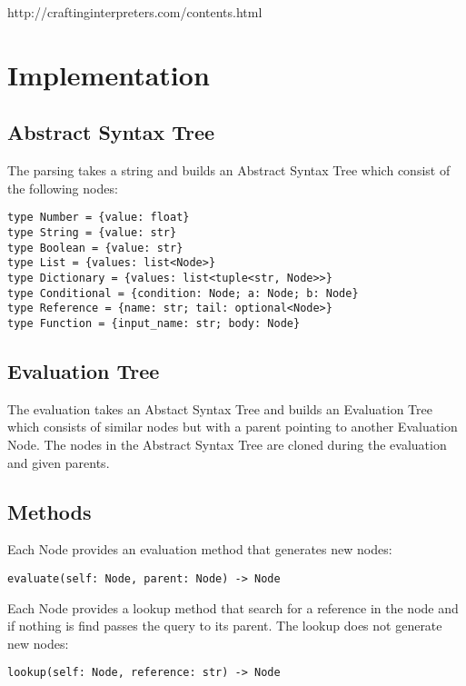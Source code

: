 \documentclass[a4paper,12pt]{article}
\begin{document}
http://craftinginterpreters.com/contents.html

\section{Implementation}

\subsection{Abstract Syntax Tree}
The parsing takes a string and builds an Abstract Syntax Tree which consist of the following nodes:
\begin{verbatim}
type Number = {value: float}
type String = {value: str}
type Boolean = {value: str}
type List = {values: list<Node>}
type Dictionary = {values: list<tuple<str, Node>>}
type Conditional = {condition: Node; a: Node; b: Node}
type Reference = {name: str; tail: optional<Node>}
type Function = {input_name: str; body: Node}
\end{verbatim}

\subsection{Evaluation Tree}

The evaluation takes an Abstact Syntax Tree and builds an Evaluation Tree which consists of similar nodes but with a parent pointing to another Evaluation Node. The nodes in the Abstract Syntax Tree are cloned during the evaluation and given parents.

\subsection{Methods}

Each Node provides an evaluation method that generates new nodes:
\begin{verbatim}
evaluate(self: Node, parent: Node) -> Node
\end{verbatim}
Each Node provides a lookup method that search for a reference in the node and if nothing is find passes the query to its parent. The lookup does not generate new nodes:
\begin{verbatim}
lookup(self: Node, reference: str) -> Node
\end{verbatim}
\end{document}

